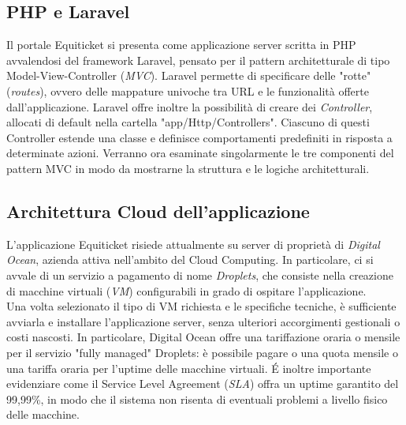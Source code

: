 \subsection{PHP e Laravel}
Il portale Equiticket si presenta come applicazione server scritta in PHP avvalendosi del framework Laravel, pensato per il pattern architetturale di tipo Model-View-Controller (\textit{MVC}).
Laravel permette di specificare delle "rotte" (\textit{routes}), ovvero delle mappature univoche tra URL e le funzionalità offerte dall'applicazione. 
Laravel offre inoltre la possibilità di creare dei \textit{Controller}, allocati di default nella cartella "app/Http/Controllers". Ciascuno di questi Controller estende una classe e definisce comportamenti predefiniti in risposta a determinate azioni. Verranno ora esaminate singolarmente le tre componenti del pattern MVC in modo da mostrarne la struttura e le logiche architetturali. 
\subsection{Architettura Cloud dell'applicazione}
L'applicazione Equiticket risiede attualmente su server di proprietà di \textit{Digital Ocean}, azienda attiva nell'ambito del Cloud Computing. In particolare, ci si avvale di un servizio a pagamento di nome \textit{Droplets}, che consiste nella creazione di macchine virtuali (\textit{VM}) configurabili in grado di ospitare l'applicazione. \\
Una volta selezionato il tipo di VM richiesta e le specifiche tecniche, è sufficiente avviarla e  installare l'applicazione server, senza ulteriori accorgimenti gestionali o costi nascosti. In particolare, Digital Ocean offre una tariffazione oraria o mensile per il servizio "fully managed" Droplets: è possibile pagare o una quota mensile o una tariffa oraria per l'uptime delle macchine virtuali. \'E inoltre importante evidenziare come il Service Level Agreement (\textit{SLA}) offra un uptime garantito del 99,99\%, in modo che il sistema non risenta di eventuali problemi a livello fisico delle macchine. 
